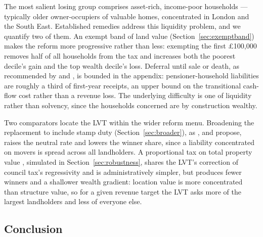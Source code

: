 The most salient losing group comprises asset-rich, income-poor households --- typically older owner-occupiers of valuable homes, concentrated in London and the South East. Established remedies address this liquidity problem, and we quantify two of them. An exempt band of land value (Section~\ref{sec:exemptband}) makes the reform more progressive rather than less: exempting the first \pounds 100{,}000 removes half of all households from the tax and increases both the poorest decile's gain and the top wealth decile's loss. Deferral until sale or death, as recommended by \citet{mirrlees2011} and \citet{muellbauer2018}, is bounded in the appendix: pensioner-household liabilities are roughly a third of first-year receipts, an upper bound on the transitional cash-flow cost rather than a revenue loss. The underlying difficulty is one of liquidity rather than solvency, since the households concerned are by construction wealthy.

Two comparators locate the LVT within the wider reform menu. Broadening the replacement to include stamp duty (Section~\ref{sec:broader}), as \citet{mirrlees2011}, \citet{muellbauer2005} and \citet{leunig2024} propose, raises the neutral rate and lowers the winner share, since a liability concentrated on movers is spread across all landholders. A proportional tax on total property value \citep{muellbauer2005, corlett2018}, simulated in Section~\ref{sec:robustness}, shares the LVT's correction of council tax's regressivity and is administratively simpler, but produces fewer winners and a shallower wealth gradient: location value is more concentrated than structure value, so for a given revenue target the LVT asks more of the largest landholders and less of everyone else.

\subsection{Conclusion}


